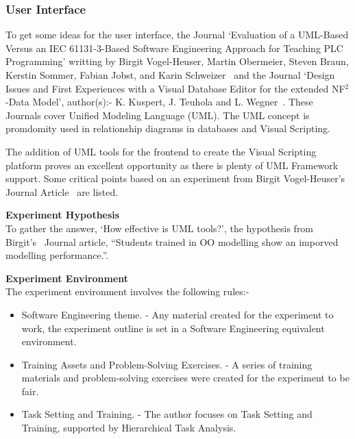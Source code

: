 \documentclass[conference]{IEEEtran}
\begin{document}
        \subsubsection{User Interface}
        \label{subsubsec:userInterface}
          To get some ideas for the user interface, the Journal `Evaluation of a UML-Based Versus an IEC 61131-3-Based Software Engineering Approach for Teaching PLC Programming' writting by Birgit Vogel-Heuser, Martin Obermeier, Steven Braun, Kerstin Sommer, Fabian Jobst, and Karin Schweizer~\cite{vogel-heuser_evaluation_2013} and the Journal `Design Issues and First Experiences with a Visual Database Editor for the extended NF$^{2}$-Data Model', author(s):- K. K${\ddot{u}}$spert, J. Teuhola and L. Wegner~\cite{kuspert_design_1990}. These Journals cover Unified Modeling Language (UML). The UML concept is promdomity used in relationship diagrams in databases and Visual Scripting. 

          The addition of UML tools for the frontend to create the Visual Scripting platform proves an excellent opportunity as there is plenty of UML Framework support. Some critical points based on an experiment from Birgit Vogel-Heuser's Journal Article~\cite{vogel-heuser_evaluation_2013} are listed.

          \textbf{Experiment Hypothesis}\\
          To gather the answer, `How effective is UML tools?', the hypothesis from Birgit's~\cite{vogel-heuser_evaluation_2013} Journal article, ``Students trained in OO modelling show an imporved modelling performance.''. 
        
          \textbf{Experiment Environment}\\
          The experiment environment involves the following rules:-
          \begin{itemize}
            \item Software Engineering theme. - Any material created for the experiment to work, the experiment outline is set in a Software Engineering equivalent environment.
            \item Training Assets and Problem-Solving Exercises. - A series of training materials and problem-solving exercises were created for the experiment to be fair.
            \item Task Setting and Training. - The author focuses on Task Setting and Training, supported by Hierarchical Task Analysis.
          \end{itemize}
\end{document}

